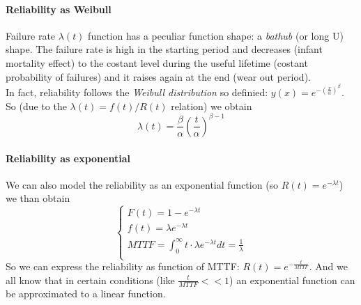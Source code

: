 \documentclass[10pt,a4paper]{article}
\begin{document}
				\paragraph{Reliability as Weibull}
					Failure rate $\lambda(t)$ function has a peculiar function shape: a \emph{bathub} (or long U) shape. The failure rate is high in the starting period and decreases (infant mortality effect) to the costant level during the useful lifetime (costant probability of failures) and it raises again at the end (wear out period).\\
					
					In fact, reliability follows the \emph{Weibull distribution} so definied: $y(x) = e^{-(\frac{x}{\alpha})^{\beta}}$. So (due to the $\lambda(t) = f(t) / R(t)$ relation) we obtain
					\begin{equation}
						\lambda(t) = \frac{\beta}{\alpha}(\frac{t}{\alpha})^{\beta - 1}
					\end{equation}
					
				\paragraph{Reliability as exponential}
					We can also model the reliability as an exponential function (so $R(t) = e^{-\lambda t}$) we than obtain
					\begin{equation}
						\begin{cases}
							F(t) = 1 - e^{-\lambda t} \\
							f(t) = \lambda e^{-\lambda t} \\
							MTTF = \int_{0}^{\infty} t\cdot \lambda e^{-\lambda t} dt = \frac{1}{\lambda}\\
						\end{cases}
					\end{equation}
					So we can express the reliability as function of MTTF: $R(t) = e^{-\frac{t}{MTTF}}$. And we all know that in certain conditions (like $\frac{t}{MTTF} << 1$) an exponential function can be approximated to a linear function.
\end{document}
